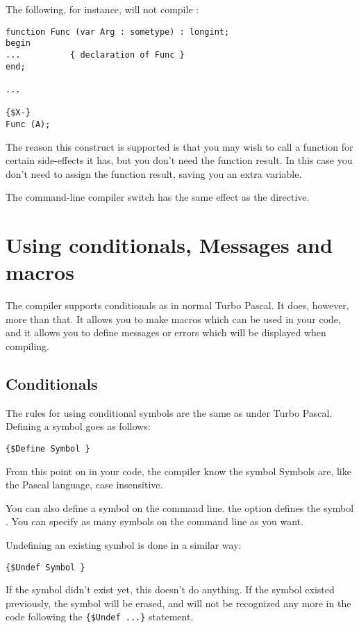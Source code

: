 \documentclass{report}
\begin{document}
The following, for instance, will not compile :
\begin{verbatim}
function Func (var Arg : sometype) : longint;
begin
...          { declaration of Func }
end;

...

{$X-}
Func (A);
\end{verbatim}
The reason this construct is supported is that
you may wish to call a function for certain side-effects it has, but you
don't need the function result. In this case you don't need to assign the
function result, saving you an extra variable.

The command-line compiler switch  has the same effect as the
 directive.


\chapter{Using conditionals, Messages and macros}
\label{ch:CondMessageMacro}
The \fpc compiler supports conditionals as in normal Turbo Pascal. It does,
however, more than that. It allows you to make macros which can be used in
your code, and it allows you to define messages or errors which will be
displayed when compiling.

\section{Conditionals}
\label{se:Conditionals}
The rules for using conditional symbols are the same as under Turbo Pascal.
Defining a symbol goes as follows:
\begin{verbatim}
{$Define Symbol }
\end{verbatim}
From this point on in your code, the compiler know the symbol 
Symbols are, like the Pascal language, case insensitive.

You can also define a symbol on the command line. the  option
defines the symbol . You can specify as many symbols on the
command line as you want.

Undefining an existing symbol is done in a similar way:
\begin{verbatim}
{$Undef Symbol }
\end{verbatim}
If the symbol didn't exist yet, this doesn't do anything. If the symbol
existed previously, the symbol will be erased, and will not be recognized
any more in the code following the \verb|{$Undef ...}| statement.
\end{document}
